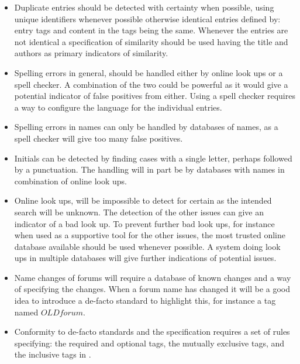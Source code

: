 \begin{itemize}
\item Duplicate entries should be detected with certainty when
  possible, using unique identifiers whenever possible otherwise
  identical entries defined by: entry tags and content in the tags
  being the same.  Whenever the entries are not identical a
  specification of similarity should be used having the title and
  authors as primary indicators of similarity.

\item Spelling errors in general, should be handled either by online
  look ups or a spell checker.  A combination of the two could be
  powerful as it would give a potential indicator of false positives
  from either.  Using a spell checker requires a way to configure the
  language for the individual entries.

\item Spelling errors in names can only be handled by databases of
  names, as a spell checker will give too many false positives.

\item Initials can be detected by finding cases with a single letter,
  perhaps followed by a punctuation. The handling will in part be by
  databases with names in combination of online look ups.

\item Online look ups, will be impossible to detect for certain as the
  intended search will be unknown.  The detection of the other issues
  can give an indicator of a bad look up.  To prevent further bad look
  ups, for instance when used as a supportive tool for the other
  issues, the most trusted online database available should be used
  whenever possible.  A system doing look ups in multiple databases
  will give further indications of potential issues.

\item Name changes of forums will require a database of known changes
  and a way of specifying the changes.  When a forum name has changed
  it will be a good idea to introduce a de-facto standard to highlight
  this, for instance a tag named $OLDforum$.

\item Conformity to de-facto standards and the {\bibtex} specification
  requires a set of rules specifying: the required and optional tags,
  the mutually exclusive tags, and the inclusive tags in {\bibtex}.


\end{itemize}
